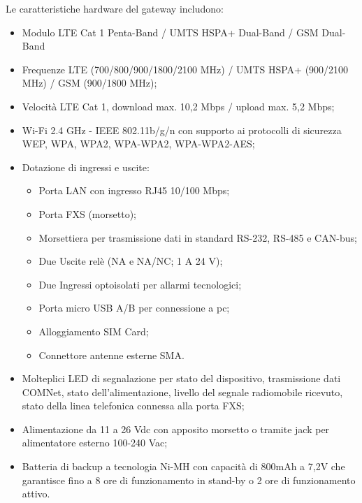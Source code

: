 Le caratteristiche hardware del gateway includono:
\begin{itemize}
	\item Modulo LTE Cat 1 Penta-Band / UMTS HSPA+ Dual-Band / GSM Dual-Band
	\item Frequenze LTE (700/800/900/1800/2100 MHz) / UMTS HSPA+ (900/2100 MHz) / GSM (900/1800 MHz);
	\item Velocità LTE Cat 1, download max. 10,2 Mbps / upload max. 5,2 Mbps;
	\item Wi-Fi 2.4 GHz - IEEE 802.11b/g/n con supporto ai protocolli di sicurezza WEP, WPA, WPA2, WPA-WPA2, WPA-WPA2-AES;
	\item Dotazione di ingressi e uscite:
	      \begin{itemize}
		      \item Porta LAN con ingresso RJ45 10/100 Mbps;
		      \item Porta FXS (morsetto);
		      \item Morsettiera per trasmissione dati in standard RS-232, RS-485 e CAN-bus;
		      \item Due Uscite relè (NA e NA/NC; 1 A 24 V);
		      \item Due Ingressi optoisolati per allarmi tecnologici;
		      \item Porta micro USB A/B per connessione a pc;
		      \item Alloggiamento SIM Card;
		      \item Connettore antenne esterne SMA.
	      \end{itemize}
	\item Molteplici LED di segnalazione per stato del dispositivo, trasmissione dati COMNet, stato dell'alimentazione, livello del segnale radiomobile ricevuto, stato della linea telefonica connessa alla porta FXS;
	\item Alimentazione  da 11 a 26 Vdc con apposito morsetto o tramite jack per alimentatore esterno 100-240 Vac;
	\item Batteria di backup a tecnologia Ni-MH con capacità di 800mAh a 7,2V che garantisce fino a 8 ore di funzionamento in stand-by o 2 ore di funzionamento attivo.
\end{itemize}